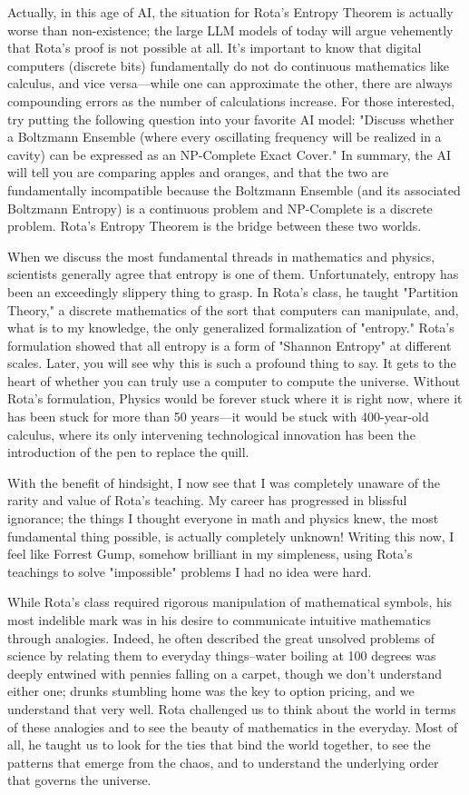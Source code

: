 \documentclass{report}
\begin{document}
Actually, in this age of AI, the situation for Rota's Entropy Theorem is actually worse than non-existence; the large LLM models of today will argue vehemently that Rota's proof is not possible at all. It's important to know that digital computers (discrete bits) fundamentally do not do continuous mathematics like calculus, and vice versa—while one can approximate the other, there are always compounding errors as the number of calculations increase. For those interested, try putting the following question into your favorite AI model: "Discuss whether a Boltzmann Ensemble (where every oscillating frequency will be realized in a cavity) can be expressed as an NP-Complete Exact Cover." In summary, the AI will tell you are comparing apples and oranges, and that the two are fundamentally incompatible because the Boltzmann Ensemble (and its associated Boltzmann Entropy) is a continuous problem and NP-Complete is a discrete problem. Rota's Entropy Theorem is the bridge between these two worlds.

When we discuss the most fundamental threads in mathematics and physics, scientists generally agree that entropy is one of them. Unfortunately, entropy has been an exceedingly slippery thing to grasp. In Rota's class, he taught "Partition Theory," a discrete mathematics of the sort that computers can manipulate, and, what is to my knowledge, the only generalized formalization of "entropy." Rota's formulation showed that all entropy is a form of "Shannon Entropy" at different scales. Later, you will see why this is such a profound thing to say. It gets to the heart of whether you can truly use a computer to compute the universe. Without Rota's formulation, Physics would be forever stuck where it is right now, where it has been stuck for more than 50 years—it would be stuck with 400-year-old calculus, where its only intervening technological innovation has been the introduction of the pen to replace the quill.

With the benefit of hindsight, I now see that I was completely unaware of the rarity and value of Rota's teaching. My career has progressed in blissful ignorance; the things I thought everyone in math and physics knew, the most fundamental thing possible, is actually completely unknown! Writing this now, I feel like Forrest Gump, somehow brilliant in my simpleness, using Rota's teachings to solve "impossible" problems I had no idea were hard.

While Rota's class required rigorous manipulation of mathematical symbols, his most indelible mark was in his desire to communicate intuitive mathematics through analogies. Indeed, he often described the great unsolved problems of science by relating them to everyday things--water boiling at 100 degrees was deeply entwined with pennies falling on a carpet, though we don't understand either one; drunks stumbling home was the key to option pricing, and we understand that very well. Rota challenged us to think about the world in terms of these analogies and to see the beauty of mathematics in the everyday. Most of all, he taught us to look for the ties that bind the world together, to see the patterns that emerge from the chaos, and to understand the underlying order that governs the universe.
\end{document}
